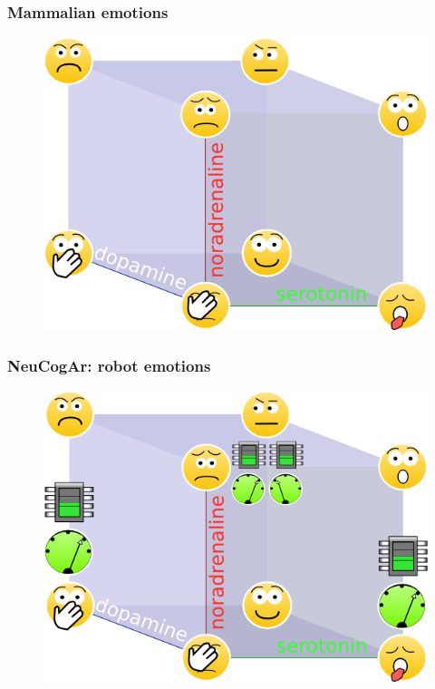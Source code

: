 \documentclass[12pt, aspectratio=169]{beamer}
\begin{document}
\begin{frame}
\frametitle{Mammalian emotions}
\begin{figure}
\includegraphics[width=0.7\linewidth]{cube_of_emotional_parameters}
\end{figure}
\end{frame}


\begin{frame}
\frametitle{NeuCogAr: robot emotions}
\begin{figure}
\includegraphics[width=0.7\linewidth]{cube_of_emotional_parameters_machine}
\end{figure}
\end{frame}

\end{document}
